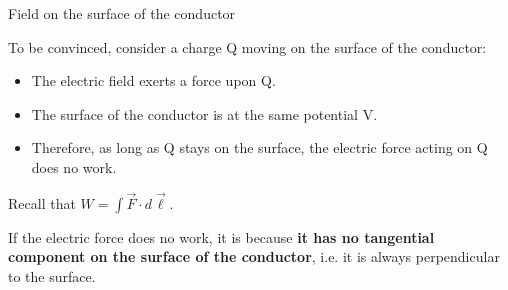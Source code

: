 %
%
%

\begin{frame}{Field on the surface of the conductor}

To be convinced, consider a charge Q moving on the surface of the conductor:\\
\vspace{0.3cm}
\begin{itemize}
  \item The electric field exerts a force upon Q.
  \item The surface of the conductor is at the same potential V.
  \item Therefore, as long as Q stays on the surface, the electric force acting on Q does no work.
\end{itemize}

\vspace{0.3cm}

Recall that $W = \int \vec{F} \cdot d\vec{\ell}$.\\

\vspace{0.3cm}

If the electric force does no work, it is because {\bf it has no tangential
component on the surface of the conductor}, i.e. it is always perpendicular to the surface.

\end{frame}


%
%
%

